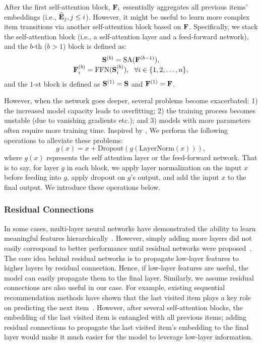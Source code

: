 \documentclass[conference]{IEEEtran}
\def\E{{\bf E}}
\def\F{{\bf F}}
\def\S{{\bf S}}
\newcommand{\xhdr}[1]{\subsubsection*{\bf #1}}
\begin{document}
After the first self-attention block, $\F_i$ essentially aggregates all previous items' embeddings (i.e., $\widehat{\E}_j, j\leq i$). However, it might be useful to learn more complex item transitions via 
another self-attention block based on $\F$. Specifically, we stack the self-attention block (i.e., a self-attention layer and a feed-forward network), and the $b$-th ($b>1$) block is defined as:
\begin{equation}
\begin{array}{c}
\S^{(b)}=\text{SA}(\F^{(b-1)}),\\
\F_i^{(b)}=\text{FFN}(\S_i^{(b)}),\ \ \forall i\in \{1,2,\dots,n\},
\end{array}
\end{equation}
and the $1$-st block is defined as $\S^{(1)}=\S$ and $\F^{(1)}=\F$.

However, when the network goes deeper, several problems become 
exacerbated:
1) the 
increased
model capacity leads to 
overfitting; 2) the training process 
becomes
unstable (due to vanishing gradients etc.); and
3) models with more parameters often require more training time. Inspired by \cite{transform}, We perform the following operations to alleviate these problems:
\[g(x)=x+\text{Dropout}(g(\text{LayerNorm}(x))),\]
where $g(x)$ represents the self attention layer or the feed-forward network. That is to say, for layer $g$ in each block, we apply 
layer normalization on the input $x$ before feeding into $g$, apply dropout on $g$'s output, and add the input $x$ to the final output. We introduce these operations
below.

\xhdr{Residual Connections} In some cases, multi-layer neural networks have 
demonstrated
the ability to learn meaningful features hierarchically~\cite{zeiler2014visualizing}. However, 
simply
adding more layers 
did not easily correspond to
better performance until residual networks
were
proposed~\cite{he2016deep}. 
The core idea behind residual networks is to
propagate
low-layer features to 
higher layers by 
residual 
connection. Hence, if low-layer features are useful, the model can easily propagate 
them
to the final layer. Similarly, we assume 
residual connections are also useful in our case. For example, existing sequential recommendation methods have shown that the last visited item plays a key role on predicting the next item~\cite{rendle2010fpmc,DBLP:conf/icdm/HeM16,DBLP:conf/recsys/HeKM17}. However, after several self-attention blocks, the embedding of the last visited item is entangled with all previous items;
adding residual connections to propagate the last visited item's embedding to the final layer would make it much easier for the model to leverage low-layer information.
\end{document}
